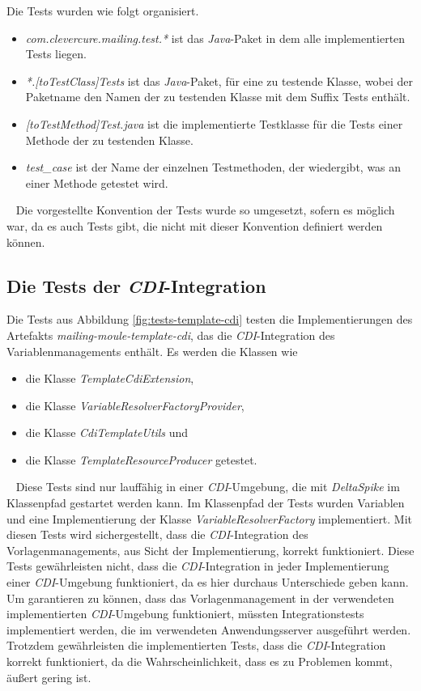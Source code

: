 \newline
\newline
Die Tests wurden wie folgt organisiert.
\begin{itemize}
	\item\emph{com.clevercure.mailing.test.*} 
	\newline
	ist das \emph{Java}-Paket in dem alle implementierten Tests liegen. 
	\item\emph{*.[toTestClass]Tests}
	\newline
	ist das \emph{Java}-Paket, für eine zu testende Klasse, wobei der Paketname den Namen der zu testenden Klasse mit dem Suffix Tests enthält.
	\item\emph{[toTestMethod]Test.java}
	\newline
	ist die implementierte Testklasse für die Tests einer Methode der zu testenden Klasse.
	\item\emph{test\_case}
	\newline
	ist der Name der einzelnen Testmethoden, der wiedergibt, was an einer Methode getestet wird. 
\end{itemize}
\ \newline
Die vorgestellte Konvention der Tests wurde so umgesetzt, sofern es möglich war, da es auch Tests gibt, die nicht mit dieser Konvention definiert werden können.

\subsection{Die Tests der \emph{CDI}-Integration}
Die Tests aus Abbildung \ref{fig:tests-template-cdi} testen die Implementierungen des Artefakts \emph{mailing-moule-template-cdi}, das die \emph{CDI}-Integration des Variablenmanagements enthält. Es werden die Klassen wie
\begin{itemize}
	\item die Klasse \emph{TemplateCdiExtension},
	\item die Klasse \emph{VariableResolverFactoryProvider},
	\item die Klasse \emph{CdiTemplateUtils} und 
	\item die Klasse \emph{TemplateResourceProducer} getestet.
\end{itemize}
\ \newline
Diese Tests sind nur lauffähig in einer \emph{CDI}-Umgebung, die mit \emph{DeltaSpike} im Klassenpfad gestartet werden kann. Im Klassenpfad der Tests wurden Variablen und eine Implementierung der Klasse \emph{VariableResolverFactory} implementiert. Mit diesen Tests wird sichergestellt, dass die \emph{CDI}-Integration des Vorlagenmanagements, aus Sicht der Implementierung, korrekt funktioniert. Diese Tests gewährleisten nicht, dass die \emph{CDI}-Integration in jeder Implementierung einer \emph{CDI}-Umgebung funktioniert, da es hier durchaus Unterschiede geben kann. Um garantieren zu können, dass das Vorlagenmanagement in der verwendeten implementierten \emph{CDI}-Umgebung funktioniert, müssten Integrationstests implementiert werden, die im verwendeten Anwendungsserver ausgeführt werden. Trotzdem gewährleisten die implementierten Tests, dass die \emph{CDI}-Integration korrekt funktioniert, da die Wahrscheinlichkeit, dass es zu Problemen kommt, äußert gering ist.

